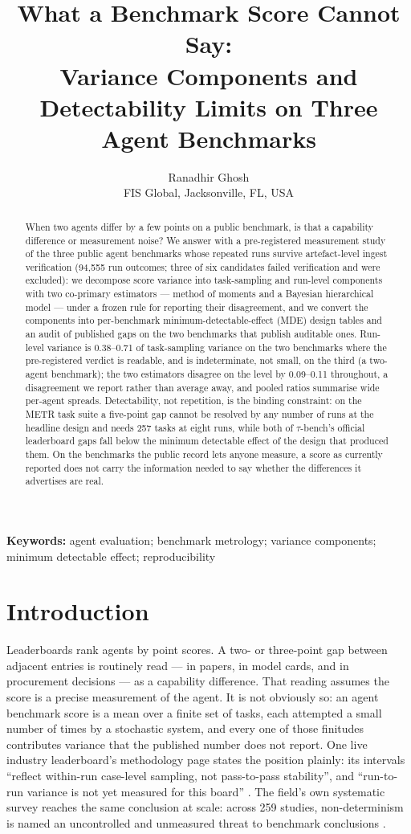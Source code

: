 \documentclass[11pt]{article}
\title{What a Benchmark Score Cannot Say:\\
Variance Components and Detectability Limits on Three Agent Benchmarks}
\author{Ranadhir Ghosh\\
FIS Global, Jacksonville, FL, USA}
\date{}
\begin{document}
\maketitle

\begin{abstract}
When two agents differ by a few points on a public benchmark, is that a
capability difference or measurement noise? We answer with a
pre-registered measurement study of the three public agent benchmarks
whose repeated runs survive artefact-level ingest verification (94,555
run outcomes; three of six candidates failed verification and were
excluded): we decompose score variance into task-sampling and run-level
components with two co-primary estimators --- method of moments and a
Bayesian hierarchical model --- under a frozen rule for reporting their
disagreement, and we convert the components into per-benchmark
minimum-detectable-effect (MDE) design tables and an audit of published
gaps on the two benchmarks that publish auditable ones. Run-level
variance is 0.38--0.71 of task-sampling variance on the two benchmarks
where the pre-registered verdict is readable, and is indeterminate,
not small, on the third (a two-agent benchmark); the two estimators
disagree on the level by 0.09--0.11 throughout, a disagreement we
report rather than average away, and pooled ratios summarise wide
per-agent spreads. Detectability, not repetition, is the binding
constraint: on the METR task suite a five-point gap cannot be resolved
by any number of runs at the headline design and needs 257 tasks at
eight runs, while both of $\tau$-bench's official leaderboard gaps fall
below the minimum detectable effect of the design that produced them.
On the benchmarks the public record lets anyone measure, a score as
currently reported does not carry the information needed to say
whether the differences it advertises are real.
\end{abstract}

\noindent\textbf{Keywords:} agent evaluation; benchmark metrology;
variance components; minimum detectable effect; reproducibility

\section{Introduction}

Leaderboards rank agents by point scores. A two- or three-point gap
between adjacent entries is routinely read --- in papers, in model
cards, and in procurement decisions --- as a capability difference.
That reading assumes the score is a precise measurement of the agent.
It is not obviously so: an agent benchmark score is a mean over a
finite set of tasks, each attempted a small number of times by a
stochastic system, and every one of those finitudes contributes
variance that the published number does not report. One live industry
leaderboard's methodology page states the position plainly: its
intervals ``reflect within-run case-level sampling, not pass-to-pass
stability'', and ``run-to-run variance is not yet measured for this
board'' \cite{algolia2026}. The field's own systematic survey reaches
the same conclusion at scale: across 259 studies, non-determinism is
named an uncontrolled and unmeasured threat to benchmark conclusions
\cite{nageshwaran2026}.
\end{document}
